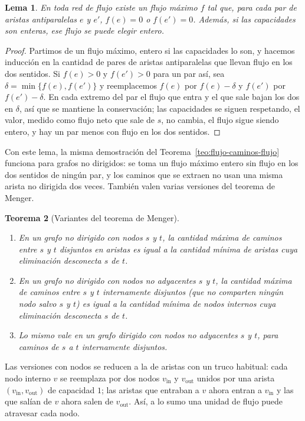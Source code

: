 \documentclass[12pt, spanish, oneside, openany]{book}
\theoremstyle{uprightplain}
\newtheorem{teorema}{Teorema}[section]
\newtheorem{lema}[teorema]{Lema}
\theoremstyle{definition}
\theoremstyle{remark}
\theoremstyle{definition}
\begin{document}
\begin{lema}
\label{lema:flujo-antiparalelas}
En toda red de flujo existe un flujo máximo $f$ tal que, para cada par de aristas antiparalelas $e$ y $e'$, $f(e)=0$ o $f(e')=0$. Además, si las capacidades son enteras, ese flujo se puede elegir entero.
\end{lema}
\begin{proof}
Partimos de un flujo máximo, entero si las capacidades lo son, y hacemos inducción en la cantidad de pares de aristas antiparalelas que llevan flujo en los dos sentidos. Si $f(e)>0$ y $f(e')>0$ para un par así, sea $\delta=\min\{f(e),f(e')\}$ y reemplacemos $f(e)$ por $f(e)-\delta$ y $f(e')$ por $f(e')-\delta$. En cada extremo del par el flujo que entra y el que sale bajan los dos en $\delta$, así que se mantiene la conservación; las capacidades se siguen respetando, el valor, medido como flujo neto que sale de $s$, no cambia, el flujo sigue siendo entero, y hay un par menos con flujo en los dos sentidos.
\end{proof}

Con este lema, la misma demostración del Teorema~\ref{teo:flujo-caminos-flujo} funciona para grafos no dirigidos: se toma un flujo máximo entero sin flujo en los dos sentidos de ningún par, y los caminos que se extraen no usan una misma arista no dirigida dos veces. También valen varias versiones del teorema de Menger.

\begin{teorema}[Variantes del teorema de Menger]
\label{teo:flujo-menger-variantes}
\leavevmode
\begin{enumerate}[label=(\alph*)]
    \item En un grafo no dirigido con nodos $s$ y $t$, la cantidad máxima de caminos entre $s$ y $t$ disjuntos en aristas es igual a la cantidad mínima de aristas cuya eliminación desconecta $s$ de $t$.
    \item En un grafo no dirigido con nodos no adyacentes $s$ y $t$, la cantidad máxima de caminos entre $s$ y $t$ internamente disjuntos (que no comparten ningún nodo salvo $s$ y $t$) es igual a la cantidad mínima de nodos internos cuya eliminación desconecta $s$ de $t$.
    \item Lo mismo vale en un grafo dirigido con nodos no adyacentes $s$ y $t$, para caminos de $s$ a $t$ internamente disjuntos.
\end{enumerate}
\end{teorema}

Las versiones con nodos se reducen a la de aristas con un truco habitual: cada nodo interno $v$ se reemplaza por dos nodos $v_{\mathrm{in}}$ y $v_{\mathrm{out}}$ unidos por una arista $(v_{\mathrm{in}},v_{\mathrm{out}})$ de capacidad $1$; las aristas que entraban a $v$ ahora entran a $v_{\mathrm{in}}$ y las que salían de $v$ ahora salen de $v_{\mathrm{out}}$. Así, a lo sumo una unidad de flujo puede atravesar cada nodo.
\end{document}
